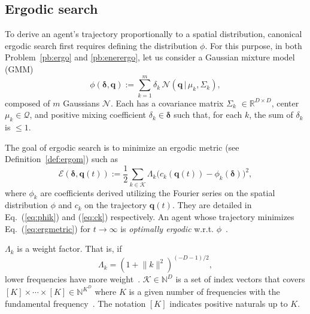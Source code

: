 \documentclass[letterpaper,10pt,conference,twoside]{IEEEtran}
\theoremstyle{definition}
\begin{document}
\subsection{Ergodic search}\label{sec:ergosearch}
\noindent
To derive an agent's trajectory proportionally to a spatial distribution, canonical ergodic search first requires defining the distribution $\phi$. 
%
For this purpose, in both Problem~\ref{pb:ergo} and \ref{pb:enerergo}, let us consider a Gaussian mixture model (GMM)
\begin{equation}\label{eq:gmm}
  \phi(\boldsymbol{\delta},\mathbf{q}):=\sum_{k=1}^{m}\delta_k\,\mathcal{N}(\mathbf{q}\,|\,\mu_k,\Sigma_k),
\end{equation} 
composed of $m$ Gaussians $\mathcal{N}$. Each has a covariance matrix ${\Sigma_k}$ $\in\mathbb{R}^{D\times D}$, center $\mu_k\in\mathcal{Q}$, and positive mixing coefficient $\delta_k\in\boldsymbol{\delta}$ such that, for each $k$, the sum of $\delta_k$ is $\leq 1$. %

The goal of ergodic search is to minimize an ergodic metric (see Definition~\ref{def:ergom}) such as~\cite{mathew2011metrics}
\begin{equation}\label{eq:ergmetric}
  \mathcal{E}(\boldsymbol{\delta},\mathbf{q}(t)):=\frac{1}{2}\sum_{k\in\mathcal{K}}\Lambda_k \big( c_k(\mathbf{q}(t))-\phi_k(\boldsymbol{\delta}) \big)^2,
\end{equation}
where $\phi_k$ are coefficients derived utilizing the Fourier series on the spatial distribution $\phi$ and $c_k$ on the trajectory $\mathbf{q}(t)$. They are detailed in Eq.~(\ref{eq:phik}) and (\ref{eq:ck}) respectively.
An agent whose trajectory %
minimizes Eq.~(\ref{eq:ergmetric}) for $t\rightarrow\infty$ is \textit{optimally ergodic} w.r.t. $\phi$~\cite{abraham2018decentralized}. 

$\Lambda_k$ is a weight factor. That is, if 
\begin{equation}
  \Lambda_k=(1+\lVert k\rVert^2)^{(-D-1)/2},
\end{equation}
lower frequencies have more weight~\cite{miller2016ergodic}.
$\mathcal{K}\in\mathbb{N}^D$ is a set of index vectors that covers $[K]\times\cdots\times[K]\in\mathbb{N}^{K^D}$ 
where $K$ is a given number of frequencies with the fundamental frequency~\cite{calinon2020mixture}. The notation $[K]$ indicates positive naturals up to $K$.
\end{document}
